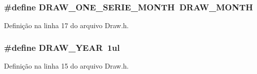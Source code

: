\subsubsection[{D\+R\+A\+W\+\_\+\+O\+N\+E\+\_\+\+S\+E\+R\+I\+E\+\_\+\+M\+O\+N\+TH}]{\setlength{\rightskip}{0pt plus 5cm}\#define D\+R\+A\+W\+\_\+\+O\+N\+E\+\_\+\+S\+E\+R\+I\+E\+\_\+\+M\+O\+N\+TH~{\bf D\+R\+A\+W\+\_\+\+M\+O\+N\+TH}}\label{_draw_8h_a736a2b1b10de94352a3c3bd177357b59}


Definição na linha 17 do arquivo Draw.\+h.

\subsubsection[{D\+R\+A\+W\+\_\+\+Y\+E\+AR}]{\setlength{\rightskip}{0pt plus 5cm}\#define D\+R\+A\+W\+\_\+\+Y\+E\+AR~1ul}\label{_draw_8h_a5fb3dbfbf8c43b1a33813e84f4d883a4}


Definição na linha 15 do arquivo Draw.\+h.

